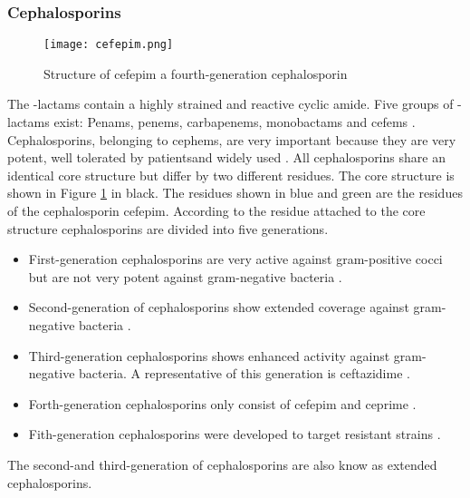 \subsubsection{Cephalosporins}
\begin{figure}
	\texttt{[image: cefepim.png]}
	\caption{Structure of cefepim a fourth-generation cephalosporin}
	\label{figure:cefepim}
\end{figure}
The \textbeta-lactams contain a highly strained and reactive cyclic amide. Five groups of \textbeta-lactams exist: Penams, penems, carbapenems, monobactams and cefems \cite{beta-lactam_nodate}. 
Cephalosporins, belonging to cephems, are very important because they are very potent, well tolerated by patientsand widely used \cite{dancer_problem_2001}. 
All cephalosporins share an identical core structure but differ by two different residues. The core structure is shown in Figure \ref{figure:cefepim} in black. The residues shown in blue and green are the residues of the cephalosporin cefepim. According to the residue attached to the core structure cephalosporins are divided into five generations.\\
\begin{itemize}
	\item First-generation cephalosporins are very active against gram-positive cocci but are not very potent against gram-negative bacteria \cite{fernandes_-lactams:_2013}.
	\item Second-generation of cephalosporins show extended coverage against gram-negative bacteria \cite{fernandes_-lactams:_2013}.
	\item Third-generation cephalosporins shows enhanced activity against gram-negative bacteria. A representative of this generation is ceftazidime \cite{klein_third-generation_1995}.
	\item Forth-generation cephalosporins only consist of cefepim and ceprime \cite{fernandes_-lactams:_2013}.
	\item Fith-generation cephalosporins were developed to target resistant strains \cite{fernandes_-lactams:_2013}.
\end{itemize}
The second-and third-generation of cephalosporins are also know as extended cephalosporins.

